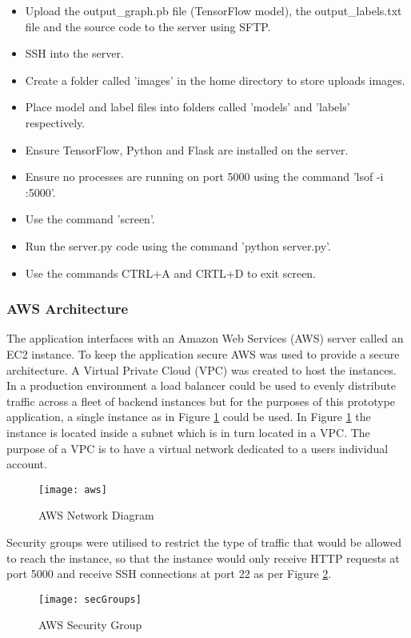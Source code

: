 \begin{itemize}
    \item{Upload the output\_graph.pb file (TensorFlow model), the output\_labels.txt file and the source code to the server using SFTP.}
    \item{SSH into the server.}
    \item{Create a folder called 'images' in the home directory to store uploads images.}
    \item{Place model and label files into folders called 'models' and 'labels' respectively.}
    \item{Ensure TensorFlow, Python and Flask are installed on the server.}
    \item{Ensure no processes are running on port 5000 using the command 'lsof -i :5000'.}
    \item{Use the command 'screen'.}
    \item{Run the server.py code using the command 'python server.py'.}
    \item{Use the commands CTRL+A and CRTL+D to exit screen.}
\end{itemize}

\tocless\subsubsection{AWS Architecture}
The application interfaces with an Amazon Web Services (AWS) server called an EC2 instance.
To keep the application secure AWS was used to provide a secure architecture.
A Virtual Private Cloud (VPC) was created to host the instances.
In a production environment a load balancer could be used to evenly distribute traffic across a fleet of backend instances but for the purposes of this prototype application, a single instance as in Figure \ref{fig:aws} could be used.
In Figure \ref{fig:aws} the instance is located inside a subnet which is in turn located in a VPC.
The purpose of a VPC is to have a virtual network dedicated to a users individual account. 
\begin{figure}[h]
    \centering
    \texttt{[image: aws]}
    \caption{AWS Network Diagram}
    \label{fig:aws}
\end{figure}

Security groups were utilised to restrict the type of traffic that would be allowed to reach the instance, so that the instance would only receive HTTP requests at port 5000 and receive SSH connections at port 22 as per Figure \ref{fig:awsSecGroup}.
\begin{figure}[h]
    \centering
    \texttt{[image: secGroups]}
    \caption{AWS Security Group}
    \label{fig:awsSecGroup}
\end{figure}

